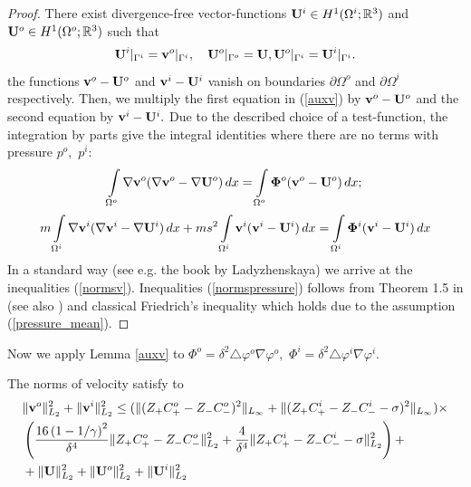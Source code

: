 \documentclass{amsart}
\begin{document}
\begin{proof}
There exist  divergence-free vector-functions ${\bf U}^i\in H^1(\Omega^i;\mathbb{R}^3)$  and ${\bf U}^o\in H^1(\Omega^o;\mathbb{R}^3)$ such that
$${\bf U}^i|_{\Gamma^i}={\bf v}^o|_{\Gamma^i}, \quad {\bf U}^o|_{\Gamma^o}={\bf U}, {\bf U}^o|_{\Gamma^i}={\bf U}^i|_{\Gamma^i}.$$
the functions ${\bf v}^{o}-{\bf U}^o$ and ${\bf v}^{i}-{\bf U}^i$ vanish on boundaries $\partial\Omega^o$ and $\partial\Omega^i$ respectively.
Then, we multiply the first equation in (\ref{auxv}) by ${\bf v}^{o}-{\bf U}^o$ and the second equation by ${\bf v}^{i}-{\bf U}^i.$ Due to the described choice of a test-function, the integration by parts give the integral identities where there are no terms with pressure $p^o,$ $p^i:$
$$\int\limits_{\Omega^o}\nabla{\bf v}^o(\nabla{\bf v}^o-\nabla{\bf U}^o)\,dx=\int\limits_{\Omega^o}{\bf \Phi}^o({\bf v}^o-{\bf U}^o)\,dx;$$
$$m\int\limits_{\Omega^i}\nabla{\bf v}^i(\nabla{\bf v}^i-\nabla{\bf U}^i)\,dx+ms^2\int\limits_{\Omega^i}{\bf v}^i({\bf v}^i-{\bf U}^i)\,dx=\int\limits_{\Omega^i}{\bf \Phi}^i({\bf v}^i-{\bf U}^i)\,dx$$
In a standard way (see e.g. the book \cite{Lad} by  Ladyzhenskaya) we arrive at the inequalities (\ref{normsv}).
Inequalities (\ref{normspressure}) follows from Theorem 1.5 in  \cite{Solonnikov} (see also \cite{Temam}) and classical Friedrich's inequality which holds due to the assumption (\ref{pressure_mean}).
\end{proof}
Now we apply Lemma \ref{auxv} to $\Phi^o=\delta^2\triangle \varphi^o\nabla \varphi^o,$ $\Phi^i=\delta^2\triangle \varphi^i\nabla \varphi^i.$
\begin{lemma}\label{normfi}
The norms of velocity satisfy to
\begin{equation}\label{Fi}
\begin{aligned}
&\|{\bf v}^o\|^2_{L_2}+\|{\bf v}^i\|^2_{L_2}\leq  (\|(Z_{+}C^o_{+}-Z_{-}C^o_{-})^2\|_{L_{\infty}}+\|(Z_{+}C^i_{+}-Z_{-}C^i_{-}-\sigma)^2\|_{L_{\infty}})\times\\
&\left(\frac{16\left(1-1/{\gamma}\right)^2}{\delta^4}\|Z_{+}C^o_{+}-Z_{-}C^o_{-}\|^2_{L_{2}}+\frac{4}{\delta^4}\|Z_{+}C^i_{+}-Z_{-}C^i_{-}-\sigma\|^2_{L_{2}}\right)+\\
&+\|{\bf U}\|^2_{L_2}+\|{\bf U}^o\|^2_{L_2}+\|{\bf U}^i\|^2_{L_2}
\end{aligned}
\end{equation}
\end{lemma}
\end{document}
